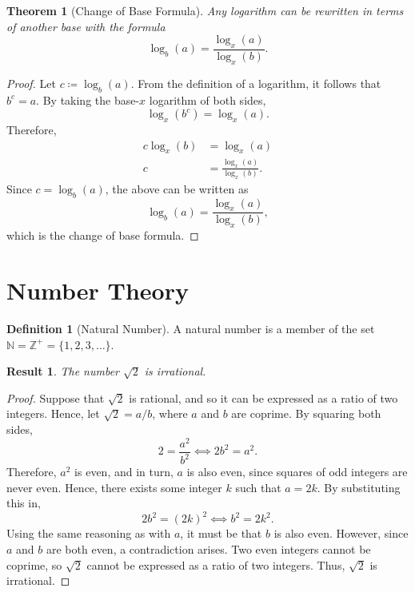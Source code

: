 \documentclass[headings=standardclasses]{scrartcl}
\newtheorem{theorem}{Theorem}
\newtheorem{result}{Result}
\theoremstyle{definition}
\newtheorem{definition}{Definition}
\begin{document}
\begin{theorem}[Change of Base Formula]
  Any logarithm can be rewritten in terms of another base with the formula
  \[ \log_{b}(a) = \frac{\log_{x}(a)}{\log_{x}(b)}. \]
\end{theorem}

\begin{proof}
  Let \(c ≔ \log_b(a)\). From the definition of a logarithm, it follows
  that \(b^c = a\). By taking the base-\(x\) logarithm of both sides,
  \begin{equation*}
      \log_x(b^c) = \log_x(a).
  \end{equation*}
  Therefore,
  \begin{align*}
      c\log_x(b) &= \log_x(a) \\
               c &= \frac{\log_x(a)}{\log_x(b)}.
  \end{align*}
  Since \(c = \log_b(a)\), the above can be written as
  \begin{equation*}
    \log_b(a) = \frac{\log_x(a)}{\log_x(b)},
  \end{equation*}
  which is the change of base formula.
\end{proof}

\section*{Number Theory}

\begin{definition}[Natural Number]
  A natural number is a member of the set \(ℕ = ℤ^{+} = \{1, 2, 3, \ldots\}\).
\end{definition}

\begin{result}
  The number \(\sqrt{2}\) is irrational.
\end{result}

\begin{proof}
  Suppose that \(\sqrt{2}\) is rational, and so it can be expressed as a ratio
  of two integers. Hence, let \(\sqrt{2} = a/b\), where \(a\) and \(b\) are
  coprime. By squaring both sides,
  \begin{equation*}
    2 = \frac{a^2}{b^2} ⟺ 2b^2 = a^2.
  \end{equation*}
  Therefore, \(a^2\) is even, and in turn, \(a\) is also even, since squares of
  odd integers are never even. Hence, there exists some integer \(k\) such that
  \(a = 2k\). By substituting this in,
  \begin{equation*}
    2b^2 = {(2k)}^2 ⟺ b^2 = 2k^2.
  \end{equation*}
  Using the same reasoning as with \(a\), it must be that \(b\) is also even.
  However, since \(a\) and \(b\) are both even, a contradiction arises. Two
  even integers cannot be coprime, so \(\sqrt{2}\) cannot be expressed as a
  ratio of two integers. Thus, \(\sqrt{2}\) is irrational.
\end{proof}
\end{document}
